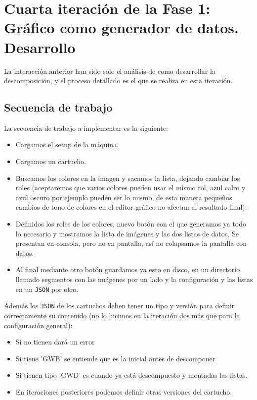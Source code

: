 \section{Cuarta iteración de la Fase 1: Gráfico como generador de datos. Desarrollo}
\label{sec:GeneradorGraficoDesarrollo}

La interacción anterior han sido solo el análisis de como desarrollar la descomposición, y el proceso detallado es el que se realiza en esta iteración.


\subsection{Secuencia de trabajo}

La secuencia de trabajo a implementar es la siguiente:

\begin{itemize}
	\item Cargamos el setup de la máquina. 
	\item Cargamos un cartucho.
	\item Buscamos los colores en la imagen y sacamos la lista, dejando cambiar los roles (aceptaremos que varios colores pueden usar el mismo rol, azul calro y azul oscuro por ejemplo pueden ser lo mismo, de esta manera pequeños cambios de tono de colores en el editor gráfico no afectan al resultado final). 
	\item Definidos los roles de los colores, nuevo botón con el que generamos ya todo lo necesario y mostramos la lista de imágenes y las dos listas de datos. Se presentan en consola, pero no en pantalla, así no colapsamos la pantalla con datos.
	\item Al final mediante otro botón guardamos ya esto en disco, en un directorio llamado segmentos con las imágenes por un lado y la configuración y las listas en un \texttt{JSON} por otro.
\end{itemize} 

Además los \texttt{JSON} de los cartuchos deben tener un tipo y versión para definir correctamente su contenido (no lo hicimos en la iteración dos más que para la configuración general):
\begin{itemize}
	\item Si no tienen dará un error
	\item Si tiene 'GWB' se entiende que es la inicial antes de descomponer
	\item Si tienen tipo 'GWD' es cuando ya está descompuesto y montadas las listas.
	\item En iteraciones posteriores podemos definir otras versiones del cartucho.
\end{itemize}

